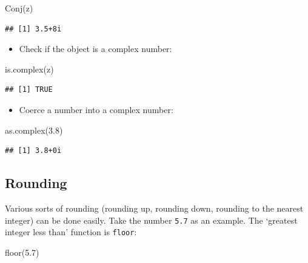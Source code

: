 \documentclass[
]{book}
\newenvironment{Shaded}{\begin{snugshade}}{\end{snugshade}}
\newcommand{\FloatTok}[1]{\textcolor[rgb]{0.00,0.00,0.81}{#1}}
\newcommand{\FunctionTok}[1]{\textcolor[rgb]{0.00,0.00,0.00}{#1}}
\newcommand{\NormalTok}[1]{#1}
\providecommand{\tightlist}{%
  \setlength{\itemsep}{0pt}\setlength{\parskip}{0pt}}
\begin{document}
\begin{Shaded}
\begin{Highlighting}[]
\FunctionTok{Conj}\NormalTok{(z)}
\end{Highlighting}
\end{Shaded}

\begin{verbatim}
## [1] 3.5+8i
\end{verbatim}

\begin{itemize}
\tightlist
\item
  Check if the object is a complex number:
\end{itemize}

\begin{Shaded}
\begin{Highlighting}[]
\FunctionTok{is.complex}\NormalTok{(z)}
\end{Highlighting}
\end{Shaded}

\begin{verbatim}
## [1] TRUE
\end{verbatim}

\begin{itemize}
\tightlist
\item
  Coerce a number into a complex number:
\end{itemize}

\begin{Shaded}
\begin{Highlighting}[]
\FunctionTok{as.complex}\NormalTok{(}\FloatTok{3.8}\NormalTok{)}
\end{Highlighting}
\end{Shaded}

\begin{verbatim}
## [1] 3.8+0i
\end{verbatim}

\hypertarget{rounding}{%
\subsection{Rounding}\label{rounding}}

Various sorts of rounding (rounding up, rounding down, rounding to the nearest integer) can be done easily. Take the number \texttt{5.7} as an example. The `greatest integer less than' function is \texttt{floor}:

\begin{Shaded}
\begin{Highlighting}[]
\FunctionTok{floor}\NormalTok{(}\FloatTok{5.7}\NormalTok{)}
\end{Highlighting}
\end{Shaded}
\end{document}
